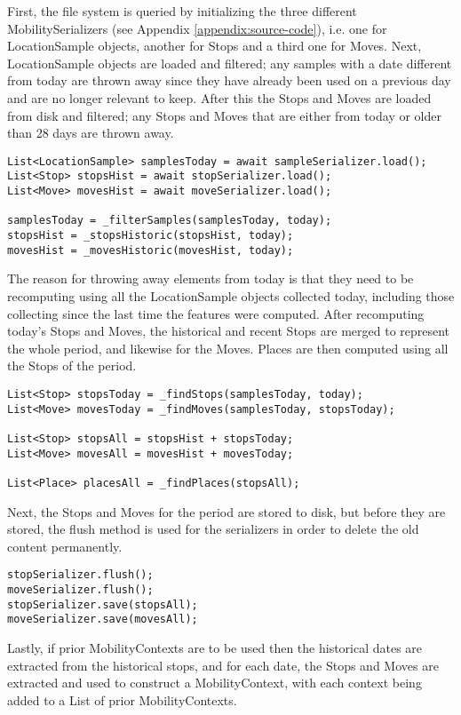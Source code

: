 First, the file system is queried by initializing the three different MobilitySerializers (see Appendix \ref{appendix:source-code}), i.e. one for LocationSample objects, another for Stops and a third one for Moves. Next, LocationSample objects are loaded and filtered; any samples with a date different from today are thrown away since they have already been used on a previous day and are no longer relevant to keep. After this the Stops and Moves are loaded from disk and filtered; any Stops and Moves that are either from today or older than 28 days are thrown away.

\begin{verbatim}
List<LocationSample> samplesToday = await sampleSerializer.load();
List<Stop> stopsHist = await stopSerializer.load();
List<Move> movesHist = await moveSerializer.load();

samplesToday = _filterSamples(samplesToday, today);
stopsHist = _stopsHistoric(stopsHist, today);
movesHist = _movesHistoric(movesHist, today);
\end{verbatim}

The reason for throwing away elements from today is that they need to be recomputing using all the LocationSample objects collected today, including those collecting since the last time the features were computed. After recomputing today's Stops and Moves, the historical and recent Stops are merged to represent the whole period, and likewise for the Moves. Places are then computed using all the Stops of the period.

\begin{verbatim}
List<Stop> stopsToday = _findStops(samplesToday, today);
List<Move> movesToday = _findMoves(samplesToday, stopsToday);

List<Stop> stopsAll = stopsHist + stopsToday;
List<Move> movesAll = movesHist + movesToday;

List<Place> placesAll = _findPlaces(stopsAll);
\end{verbatim}

Next, the Stops and Moves for the period are stored to disk, but before they are stored, the flush method is used for the serializers in order to delete the old content permanently.
\begin{verbatim}
stopSerializer.flush();
moveSerializer.flush();
stopSerializer.save(stopsAll);
moveSerializer.save(movesAll);
\end{verbatim}

Lastly, if prior MobilityContexts are to be used then the historical dates are extracted from the historical stops, and for each date, the Stops and Moves are extracted and used to construct a MobilityContext, with each context being added to a List of prior MobilityContexts.

